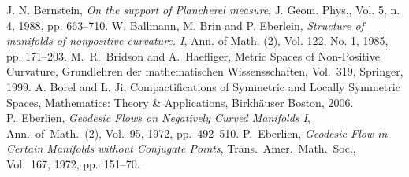  J. N. Bernstein, \textit{On the support of Plancherel measure}, J. Geom. Phys., Vol. 5, n. 4, 1988, pp. 663--710.
 W. Ballmann, M. Brin and P. Eberlein, \textit{Structure of manifolds of nonpositive curvature. I}, Ann. of Math. (2), Vol. 122, No. 1, 1985, pp. 171--203.
 M.~R.~Bridson and A.~Haefliger, Metric Spaces of Non-Positive Curvature, Grundlehren der mathematischen Wissensschaften, Vol.~319, Springer, 1999.
 A. Borel and L. Ji, Compactifications of Symmetric and Locally Symmetric Spaces, Mathematics: Theory \& Applications,  Birkhäuser  Boston, 2006.
 P.~Eberlien, \textit{Geodesic Flows on Negatively Curved Manifolds I}, Ann.~of~Math.~(2), Vol.~95, 1972, pp.~492--510.
 P.~Eberlien, \textit{Geodesic Flow in Certain Manifolds without Conjugate Points}, Trans.~Amer.~Math.~Soc., Vol.~167, 1972, pp.~151--70.
